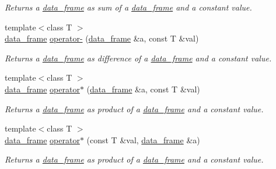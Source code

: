 \begin{DoxyCompactItemize}
\begin{DoxyCompactList}\small\item\em Returns a \hyperlink{classboost_1_1numeric_1_1ublas_1_1data__frame}{data\+\_\+frame} as sum of a \hyperlink{classboost_1_1numeric_1_1ublas_1_1data__frame}{data\+\_\+frame} and a constant value. \end{DoxyCompactList}\item 
{\footnotesize template$<$class T $>$ }\\\hyperlink{classboost_1_1numeric_1_1ublas_1_1data__frame}{data\+\_\+frame} \hyperlink{namespaceboost_1_1numeric_1_1ublas_ad7505ba5ac6c6aa713e84fac5a69ac05}{operator-\/} (\hyperlink{classboost_1_1numeric_1_1ublas_1_1data__frame}{data\+\_\+frame} \&a, const T \&val)
\begin{DoxyCompactList}\small\item\em Returns a \hyperlink{classboost_1_1numeric_1_1ublas_1_1data__frame}{data\+\_\+frame} as difference of a \hyperlink{classboost_1_1numeric_1_1ublas_1_1data__frame}{data\+\_\+frame} and a constant value. \end{DoxyCompactList}\item 
{\footnotesize template$<$class T $>$ }\\\hyperlink{classboost_1_1numeric_1_1ublas_1_1data__frame}{data\+\_\+frame} \hyperlink{namespaceboost_1_1numeric_1_1ublas_a3284a7108f4321ba2dda7ee61c87965c}{operator$\ast$} (\hyperlink{classboost_1_1numeric_1_1ublas_1_1data__frame}{data\+\_\+frame} \&a, const T \&val)
\begin{DoxyCompactList}\small\item\em Returns a \hyperlink{classboost_1_1numeric_1_1ublas_1_1data__frame}{data\+\_\+frame} as product of a \hyperlink{classboost_1_1numeric_1_1ublas_1_1data__frame}{data\+\_\+frame} and a constant value. \end{DoxyCompactList}\item 
{\footnotesize template$<$class T $>$ }\\\hyperlink{classboost_1_1numeric_1_1ublas_1_1data__frame}{data\+\_\+frame} \hyperlink{namespaceboost_1_1numeric_1_1ublas_a9982df9f93c16e17d970027d4baad321}{operator$\ast$} (const T \&val, \hyperlink{classboost_1_1numeric_1_1ublas_1_1data__frame}{data\+\_\+frame} \&a)
\begin{DoxyCompactList}\small\item\em Returns a \hyperlink{classboost_1_1numeric_1_1ublas_1_1data__frame}{data\+\_\+frame} as product of a \hyperlink{classboost_1_1numeric_1_1ublas_1_1data__frame}{data\+\_\+frame} and a constant value. \end{DoxyCompactList}\item 

\end{DoxyCompactItemize}
